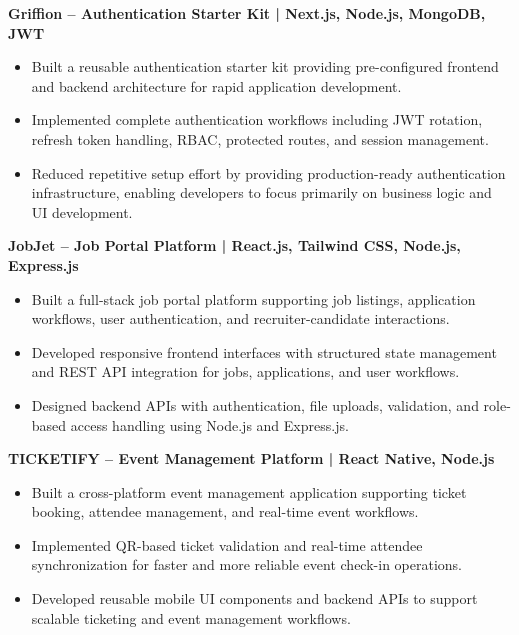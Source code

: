 \documentclass[a4paper,10pt]{article}
\begin{document}
\textbf{Griffion -- Authentication Starter Kit | Next.js, Node.js, MongoDB, JWT}

\begin{itemize}[leftmargin=*]
    \item Built a reusable authentication starter kit providing pre-configured frontend and backend architecture for rapid application development.
    
    \item Implemented complete authentication workflows including JWT rotation, refresh token handling, RBAC, protected routes, and session management.
    
    \item Reduced repetitive setup effort by providing production-ready authentication infrastructure, enabling developers to focus primarily on business logic and UI development.
\end{itemize}

\textbf{JobJet -- Job Portal Platform | React.js, Tailwind CSS, Node.js, Express.js}

\begin{itemize}[leftmargin=*]
    \item Built a full-stack job portal platform supporting job listings, application workflows, user authentication, and recruiter-candidate interactions.
    
    \item Developed responsive frontend interfaces with structured state management and REST API integration for jobs, applications, and user workflows.
    
    \item Designed backend APIs with authentication, file uploads, validation, and role-based access handling using Node.js and Express.js.
\end{itemize}

\textbf{TICKETIFY -- Event Management Platform | React Native, Node.js}

\begin{itemize}[leftmargin=*]
    \item Built a cross-platform event management application supporting ticket booking, attendee management, and real-time event workflows.
    
    \item Implemented QR-based ticket validation and real-time attendee synchronization for faster and more reliable event check-in operations.
    
    \item Developed reusable mobile UI components and backend APIs to support scalable ticketing and event management workflows.
\end{itemize}
\end{document}
